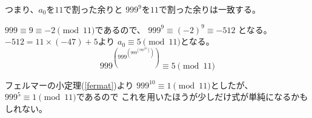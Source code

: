 \documentclass[12pt,b5paper]{ltjsarticle}
\begin{document}
つまり、$a_{0}$を$11$で割った余りと
$999^9$を$11$で割った余りは一致する。



$999 \equiv 9 \equiv -2 \pmod{11}$であるので、
$999^9 \equiv (-2)^9 \equiv -512$
となる。
$-512=11\times (-47) + 5$より
$a_{0}\equiv 5\pmod{11}$となる。
\begin{equation}
 999^{\left( 999^{\left( 999^{\left( 999^{999} \right)} \right)} \right)}
  \equiv 5 \pmod{11}
\end{equation}


\hrulefill


フェルマーの小定理(\ref{fermat})より
$999^{10}\equiv 1\pmod{11}$としたが、
$999^{5}\equiv 1\pmod{11}$であるので
これを用いたほうが少しだけ式が単純になるかもしれない。

\hrulefill
\end{document}

